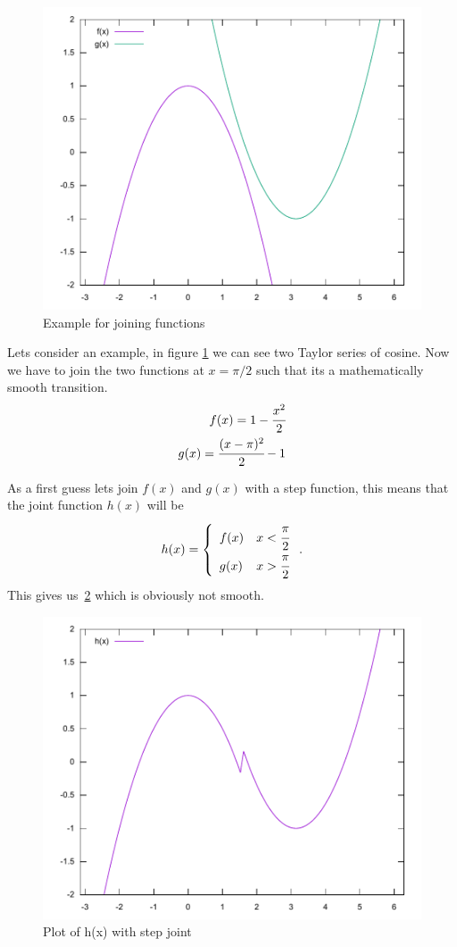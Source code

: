 \documentclass[11pt,DIV=10,final]{scrreprt} %
\begin{document}
\begin{figure}[h]\label{fig:cos_taylor}
  \centering
  \includegraphics[width=.9\textwidth]{plots/cos_taylor.pdf}
  \caption{Example for joining functions}
\end{figure}

Lets consider an example, in figure \ref{fig:cos_taylor} we can see two Taylor series of cosine. Now we have to join the two functions at $x = \pi / 2$ such that its a mathematically smooth transition.
\begin{align}
  \label{joint:f}
  f(x) = 1 - \cfrac{x^{2}}{2} \\
  \label{joint:g}
  g(x) = \cfrac{(x - \pi)^{2}}{2} -  1
\end{align}

As a first guess lets join $f(x)$ and $g(x)$ with a step function, this means that the joint function $h(x)$ will be
\[
  h(x) =  \left\{
    \begin{array}{ll}
           f(x) & x < \cfrac{\pi}{2} \\
           g(x) & x > \cfrac{\pi}{2}
    \end{array}
    \right..
\]
This gives us~\ref{fig:joint-step} which is obviously not smooth.
\begin{figure}[H]\label{fig:joint-step}
  \centering
  \includegraphics[width=.9\textwidth]{plots/step_joint.pdf}
  \caption{Plot of h(x) with step joint}
\end{figure}
\end{document}
